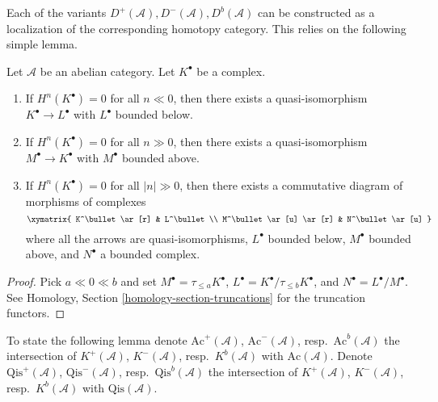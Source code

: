 \noindent
Each of the variants $D^{+}(\mathcal{A}), D^{-}(\mathcal{A}), D^b(\mathcal{A})$
can be constructed as a localization of the corresponding homotopy category.
This relies on the following simple lemma.

\begin{lemma}
\label{lemma-complex-cohomology-bounded}
Let $\mathcal{A}$ be an abelian category.
Let $K^\bullet$ be a complex.
\begin{enumerate}
\item If $H^n(K^\bullet) = 0$ for all $n \ll 0$, then there exists
a quasi-isomorphism $K^\bullet \to L^\bullet$ with $L^\bullet$
bounded below.
\item If $H^n(K^\bullet) = 0$ for all $n \gg 0$, then there exists
a quasi-isomorphism $M^\bullet \to K^\bullet$ with $M^\bullet$
bounded above.
\item If $H^n(K^\bullet) = 0$ for all $|n| \gg 0$, then there exists
a commutative diagram of morphisms of complexes
$$
\xymatrix{
K^\bullet \ar[r] & L^\bullet \\
M^\bullet \ar[u] \ar[r] & N^\bullet \ar[u]
}
$$
where all the arrows are quasi-isomorphisms, $L^\bullet$
bounded below, $M^\bullet$ bounded above, and $N^\bullet$ a bounded
complex.
\end{enumerate}
\end{lemma}

\begin{proof}
Pick $a \ll 0 \ll b$ and set $M^\bullet = \tau_{\leq a}K^\bullet$,
$L^\bullet = K^\bullet/\tau_{\leq b}K^\bullet$, and
$N^\bullet = L^\bullet/M^\bullet$.
See
Homology, Section \ref{homology-section-truncations}
for the truncation functors.
\end{proof}

\noindent
To state the following lemma denote
$\text{Ac}^{+}(\mathcal{A})$, $\text{Ac}^{-}(\mathcal{A})$,
resp.\ $\text{Ac}^b(\mathcal{A})$ the intersection of
$K^{+}(\mathcal{A})$, $K^{-}(\mathcal{A})$, resp.\ $K^b(\mathcal{A})$
with $\text{Ac}(\mathcal{A})$.
Denote $\text{Qis}^{+}(\mathcal{A})$, $\text{Qis}^{-}(\mathcal{A})$,
resp.\ $\text{Qis}^b(\mathcal{A})$ the intersection of
$K^{+}(\mathcal{A})$, $K^{-}(\mathcal{A})$, resp.\ $K^b(\mathcal{A})$
with $\text{Qis}(\mathcal{A})$.

